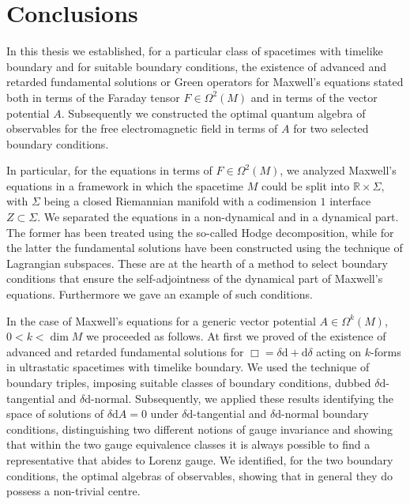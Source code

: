 \chapter*{Conclusions}

In this thesis we established, for a particular class of spacetimes with timelike boundary and for suitable boundary conditions, the existence of advanced and retarded fundamental solutions or Green operators for Maxwell's equations stated both in terms of the Faraday tensor $F\in\Omega^2(M)$ and in terms of the vector potential $A$. Subsequently we constructed the optimal quantum algebra of observables for the free electromagnetic field in terms of $A$ for two selected boundary conditions.

In particular, for the equations in terms of $F\in\Omega^2(M)$, we analyzed Maxwell's equations in a framework in which the spacetime $M$ could be split into $\mathbb{R}\times\Sigma$, with $\Sigma$ being a closed Riemannian manifold with a codimension $1$ interface $Z\subset\Sigma$. We separated the equations in a non-dynamical and in a dynamical part. The former has been treated using the so-called Hodge decomposition, while for the latter the fundamental solutions have been constructed using the technique of {Lagrangian subspaces}. These are at the hearth of a method to select boundary conditions that ensure the self-adjointness of the dynamical part of Maxwell's equations. Furthermore we gave an example of such conditions.

In the case of Maxwell's equations for a generic vector potential $A\in\Omega^k(M)$, $0<k<\dim M$ we proceeded as follows. At first we proved of the existence of advanced and retarded fundamental solutions for $\Box=\delta\mathrm{d}+\mathrm{d}\delta$ acting on $k$-forms in ultrastatic spacetimes with timelike boundary. We used the technique of {boundary triples}, imposing suitable classes of boundary conditions, dubbed $\delta\mathrm{d}$-tangential and $\delta\mathrm{d}$-normal. Subsequently, we applied these results identifying the space of solutions of $\delta\mathrm{d} A=0$ under $\delta\mathrm{d}$-tangential and $\delta\mathrm{d}$-normal boundary conditions, distinguishing two different notions of gauge invariance and showing that within the two gauge equivalence classes it is always possible to find a representative that abides to Lorenz gauge. We identified, for the two boundary conditions, the optimal algebras of observables, showing that in general they do possess a non-trivial centre.\\

